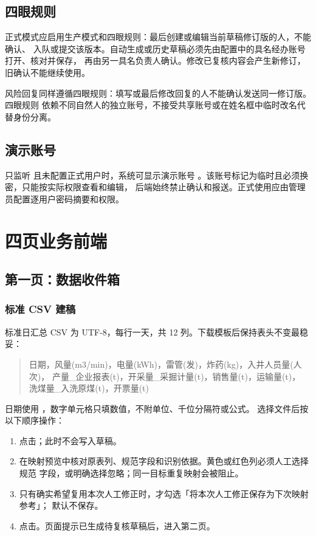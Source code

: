 \documentclass[UTF8,openany,zihao=-4,fontset=none]{ctexbook}
\begin{document}
\section{四眼规则}

正式模式应启用生产模式和四眼规则：最后创建或编辑当前草稿修订版的人，不能确认、
入队或提交该版本。自动生成或历史草稿必须先由配置中的具名经办账号打开、核对并保存，
再由另一具名负责人确认。修改已复核内容会产生新修订，旧确认不能继续使用。

风险回复同样遵循四眼规则：填写或最后修改回复的人不能确认发送同一修订版。四眼规则
依赖不同自然人的独立账号，不接受共享账号或在姓名框中临时改名代替身份分离。

\section{演示账号}

只监听  且未配置正式用户时，系统可显示演示账号
。该账号标记为临时且必须换密，只能按实际权限查看和编辑，
后端始终禁止确认和报送。正式使用应由管理员配置逐用户密码摘要和权限。

\chapter{四页业务前端}

\section{第一页：数据收件箱}

\subsection{标准 CSV 建稿}

标准日汇总 CSV 为 UTF-8，每行一天，共 12 列。下载模板后保持表头不变最稳妥：

\begin{quote}\small
日期，风量(m3/min)，电量(kWh)，雷管(发)，炸药(kg)，入井人员量(人次)，
产量\_企业报表(t)，开采量\_采掘计量(t)，销售量(t)，运输量(t)，
洗煤量\_入洗原煤(t)，开票量(t)
\end{quote}

日期使用 ，数字单元格只填数值，不附单位、千位分隔符或公式。
选择文件后按以下顺序操作：

\begin{enumerate}
  \item 点击；此时不会写入草稿。
  \item 在映射预览中核对原表列、规范字段和识别依据。黄色或红色列必须人工选择规范
  字段，或明确选择忽略；同一目标重复映射会被阻止。
  \item 只有确实希望复用本次人工修正时，才勾选「将本次人工修正保存为下次映射参考」；
  默认不保存。
  \item 点击。页面提示已生成待复核草稿后，进入第二页。
\end{enumerate}
\end{document}
